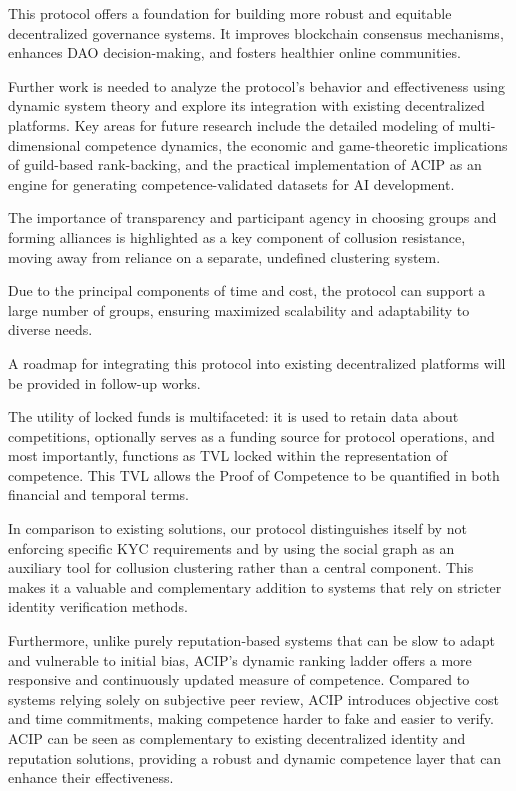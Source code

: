 \documentclass{article}
\begin{document}
\begin{CJK}{UTF8}{gbsn}
    This protocol offers a foundation for building more robust and equitable decentralized governance systems. It improves blockchain consensus mechanisms, enhances DAO decision-making, and fosters healthier online communities.

    Further work is needed to analyze the protocol's behavior and effectiveness using dynamic system theory and explore its integration with existing decentralized platforms. {{Key areas for future research include the detailed modeling of multi-dimensional competence dynamics, the economic and game-theoretic implications of guild-based rank-backing, and the practical implementation of ACIP as an engine for generating competence-validated datasets for AI development.}}

    The importance of transparency and participant agency in choosing groups and forming alliances is highlighted as a key component of collusion resistance, moving away from reliance on a separate, undefined clustering system.

    Due to the principal components of time and cost, the protocol can support a large number of groups, ensuring maximized scalability and adaptability to diverse needs.

    A roadmap for integrating this protocol into existing decentralized platforms will be provided in follow-up works.

    The utility of locked funds is multifaceted: it is used to retain data about competitions, optionally serves as a funding source for protocol operations, and most importantly, functions as TVL locked within the representation of competence. This TVL allows the Proof of Competence to be quantified in both financial and temporal terms.

    In comparison to existing solutions, our protocol distinguishes itself by not enforcing specific KYC requirements and by using the social graph as an auxiliary tool for collusion clustering rather than a central component. This makes it a valuable and complementary addition to systems that rely on stricter identity verification methods.

    Furthermore, unlike purely reputation-based systems that can be slow to adapt and vulnerable to initial bias, ACIP's dynamic ranking ladder offers a more responsive and continuously updated measure of competence. Compared to systems relying solely on subjective peer review, ACIP introduces objective cost and time commitments, making competence harder to fake and easier to verify. ACIP can be seen as complementary to existing decentralized identity and reputation solutions, providing a robust and dynamic competence layer that can enhance their effectiveness.


    \clearpage

    
    

    \clearpage\end{CJK}
\end{document}
